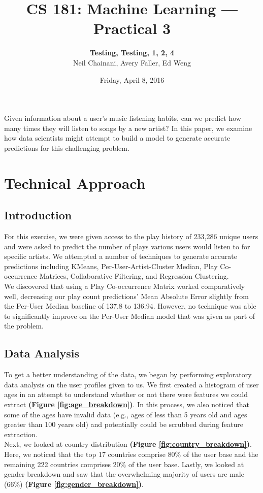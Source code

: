 \documentclass[11pt]{article}
\author{{\bf Testing, Testing, 1, 2, 4} \medskip \\ Neil Chainani, Avery Faller, Ed Weng}
\title{CS 181: Machine Learning --- Practical 3}
\date{Friday, April 8, 2016}
\begin{document}
\maketitle

\noindent Given information about a user's music listening habits, can we predict how many times they will listen to songs by a new artist? In this paper, we examine how data scientists might attempt to build a model to generate accurate predictions for this challenging problem.

\section{Technical Approach}

\subsection{Introduction}
For this exercise, we were given access to the play history of 233,286 unique users and were asked to predict the number of plays various users would listen to for specific artists. We attempted a number of techniques to generate accurate predictions including KMeans, Per-User-Artist-Cluster Median, Play Co-occurrence Matrices, Collaborative Filtering, and Regression Clustering.\\

We discovered that using a Play Co-occurrence Matrix worked comparatively well, decreasing our play count predictions' Mean Absolute Error slightly from the Per-User Median baseline of 137.8 to 136.94.  However, no technique was able to significantly improve on the Per-User Median model that was given as part of the problem. 

\subsection{Data Analysis}
To get a better understanding of the data, we began by performing exploratory data analysis on the user profiles given to us. We first created a histogram of user ages in an attempt to understand whether or not there were features we could extract {\bf (Figure \ref{fig:age_breakdown})}. In this process, we also noticed that some of the ages have invalid data (e.g., ages of less than 5 years old and ages greater than 100 years old) and potentially could be scrubbed during feature extraction. \\

Next, we looked at country distribution {\bf(Figure \ref{fig:country_breakdown})}. Here, we noticed that the top 17 countries comprise 80\% of the user base and the remaining 222 countries comprises 20\% of the user base. Lastly, we looked at gender breakdown and saw that the overwhelming majority of users are male (66\%) {\bf(Figure \ref{fig:gender_breakdown})}.\\
\end{document}
